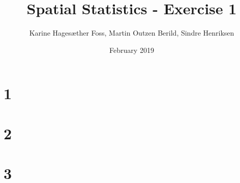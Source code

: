 \documentclass{article}
\title{Spatial Statistics - Exercise 1}
\author{Karine Hagesæther Foss, Martin Outzen Berild, Sindre Henriksen}
\date{February 2019}
\begin{document}
\maketitle

\section{1}
\label{sec:problem1}


\section{2}
\label{sec:problem2}


\section{3}
\label{sec:problem3}

\end{document}
